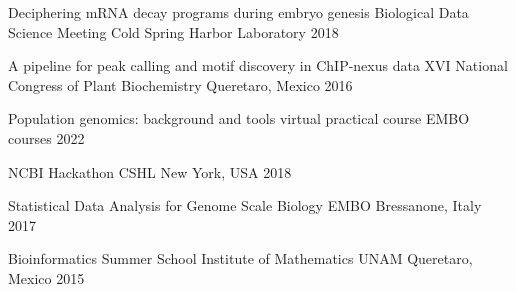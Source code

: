 


\begin{cvhonors}

  \cvhonor
    {Deciphering mRNA decay programs during embryo genesis} %
    {Biological Data Science Meeting} %
    {Cold Spring Harbor Laboratory} %
    {2018} %

  \cvhonor
    {A pipeline for peak calling and motif discovery in ChIP-nexus data} %
    {XVI National Congress of Plant Biochemistry} %
    {Queretaro, Mexico} %
    {2016} %
    

\end{cvhonors}


\begin{cvhonors}

  \cvhonor
    {Population genomics: background and tools} %
    {virtual practical course} %
    {EMBO courses} %
    {2022} %

  \cvhonor
    {NCBI Hackathon} %
    {CSHL} %
    {New York, USA} %
    {2018} %


  \cvhonor
    {Statistical Data Analysis for Genome Scale Biology} %
    {EMBO} %
    {Bressanone, Italy} %
    {2017} %

  \cvhonor
    {Bioinformatics Summer School} %
    {Institute of Mathematics UNAM} %
    {Queretaro, Mexico} %
    {2015} %
    

\end{cvhonors}
